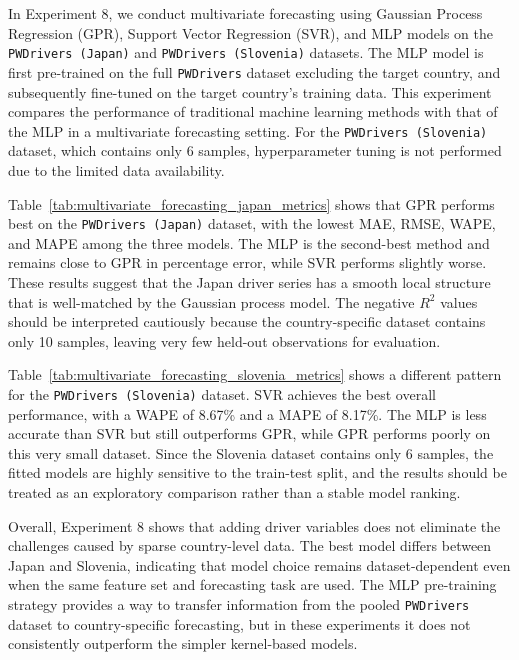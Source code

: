
In Experiment 8, we conduct multivariate forecasting using Gaussian Process Regression (GPR), Support Vector Regression (SVR), and MLP models on the \texttt{PWDrivers (Japan)} and \texttt{PWDrivers (Slovenia)} datasets. The MLP model is first pre-trained on the full \texttt{PWDrivers} dataset excluding the target country, and subsequently fine-tuned on the target country's training data. This experiment compares the performance of traditional machine learning methods with that of the MLP in a multivariate forecasting setting. For the \texttt{PWDrivers (Slovenia)} dataset, which contains only \(6\) samples, hyperparameter tuning is not performed due to the limited data availability.




Table~\ref{tab:multivariate_forecasting_japan_metrics} shows that GPR performs best on the \texttt{PWDrivers (Japan)} dataset, with the lowest MAE, RMSE, WAPE, and MAPE among the three models. The MLP is the second-best method and remains close to GPR in percentage error, while SVR performs slightly worse. These results suggest that the Japan driver series has a smooth local structure that is well-matched by the Gaussian process model. The negative \(R^2\) values should be interpreted cautiously because the country-specific dataset contains only 10 samples, leaving very few held-out observations for evaluation.

Table~\ref{tab:multivariate_forecasting_slovenia_metrics} shows a different pattern for the \texttt{PWDrivers (Slovenia)} dataset. SVR achieves the best overall performance, with a WAPE of 8.67\% and a MAPE of 8.17\%. The MLP is less accurate than SVR but still outperforms GPR, while GPR performs poorly on this very small dataset. Since the Slovenia dataset contains only 6 samples, the fitted models are highly sensitive to the train-test split, and the results should be treated as an exploratory comparison rather than a stable model ranking.

Overall, Experiment 8 shows that adding driver variables does not eliminate the challenges caused by sparse country-level data. The best model differs between Japan and Slovenia, indicating that model choice remains dataset-dependent even when the same feature set and forecasting task are used. The MLP pre-training strategy provides a way to transfer information from the pooled \texttt{PWDrivers} dataset to country-specific forecasting, but in these experiments it does not consistently outperform the simpler kernel-based models.
